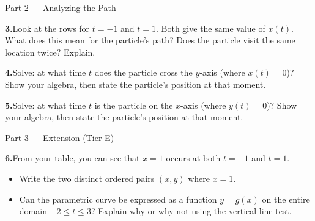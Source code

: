 \documentclass[10pt]{article}
\begin{document}
\begin{notesbox}{Part 2 --- Analyzing the Path}

\textbf{3.}\quad Look at the rows for $t = -1$ and $t = 1$.
Both give the same value of $x(t)$. What does this mean for the
particle's path? Does the particle visit the same location twice?
Explain.

\vspace{0.04in}
\textbf{4.}\quad Solve: at what time $t$ does the particle cross
the $y$-axis (where $x(t) = 0$)? Show your algebra, then state
the particle's position at that moment.

\vspace{0.04in}
\textbf{5.}\quad Solve: at what time $t$ is the particle on the
$x$-axis (where $y(t) = 0$)? Show your algebra, then state the
particle's position at that moment.

\end{notesbox}

\vspace{0.08in}

\begin{notesbox}{Part 3 --- Extension (Tier E)}

\textbf{6.}\quad From your table, you can see that $x = 1$ occurs
at both $t = -1$ and $t = 1$.
\begin{itemize}[leftmargin=1.4em, itemsep=3pt]
  \item[(a)] Write the two distinct ordered pairs $(x, y)$ where $x = 1$.
    \writeline
  \item[(b)] Can the parametric curve be expressed as a function
    $y = g(x)$ on the entire domain $-2 \le t \le 3$? Explain why
    or why not using the vertical line test.
\end{itemize}

\end{notesbox}
\end{document}
